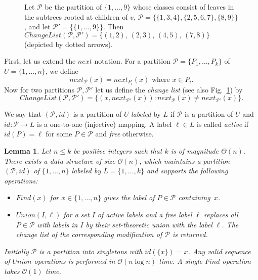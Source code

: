 \documentclass{article}
\theoremstyle{theorem}
\newtheorem{lemma}{Lemma}
\theoremstyle{definition}
\newcommand{\ChangeList}{\mathit{ChangeList}}
\renewcommand{\next}{\mathit{next}}
\newcommand{\Oh}{\mathcal{O}}
\newcommand{\PP}{\mathcal{P}}
\newcommand{\union}{\mathit{Union}}
\newcommand{\find}{\mathit{Find}}
\begin{document}
\begin{figure}[ht]
\clearpage{}
      \caption{
        Let $\PP$ be the partition of $\{1,\ldots,9\}$ whose classes
        consist of leaves in the subtrees rooted at children of $v$,
        $\PP =\{\{1,3,4\},\{2,5,6,7\},\{8,9\}\}$,
        and let $\PP'=\{\{1,\ldots,9\}\}$.
        Then $\ChangeList(\PP,\PP') = \{(1,2),\,(2,3),\,(4,5),\,(7,8)\}$
        (depicted by dotted arrows).
      }\label{fig:ChangeList}
    \end{figure}
  First, let us extend the $\next$ notation.
  For a partition $\PP   = \{P_1,\ldots,P_k\}$ of $U=\{1,\ldots,n\}$, we
  define
  $$\next_{\PP}(x)=\next_{P_i}(x)\text{ where }x\in P_i.$$
  Now for two partitions $\PP  , \PP  '$ let us define the \emph{change list} (see also Fig.~\ref{fig:ChangeList}) by
  $$\ChangeList(\PP  ,\PP  ')= \{(x, \next_{\PP'}(x)): \next_{\PP}(x)\ne \next_{\PP'}(x)\}.$$

 \newcommand{\id}{id}
 We say that $(\PP,\id)$ is a partition of $U$ \emph{labeled} by $L$ if $\PP$ is a partition of $U$ and 
 $\id : \PP \to L$ is a one-to-one (injective) mapping.
 A label $\ell\in L$ is called \emph{active} if $\id(P)=\ell$ for some $P\in
 \PP$ and \emph{free} otherwise.
 \begin{lemma}\label{lem:main_data_structure}
    Let $n\le k$ be positive integers such that $k$ is of magnitude $\Theta(n)$.
    There exists a data structure of size $\Oh(n)$, which maintains a partition $(\PP,\id)$  of $\{1,\ldots,n\}$
    labeled by $L=\{1,\ldots,k\}$ and supports the following operations:
    \begin{itemize}
      \item $\find(x)$ for $x\in\{1,\ldots,n\}$ gives the label of $P\in \PP$ containing~$x$.
      \item $\union(I,\ell)$ for a set $I$ of active labels and a free label
      $\ell$ replaces all $P\in \PP$ with labels in $I$ by their set-theoretic union with the label $\ell$.
      The change list of the corresponding modification of $\PP$ is returned.
    \end{itemize}
    Initially $\PP$ is a partition into singletons with $\id(\{x\})=x$.
    Any valid sequence of $\union$ operations is performed in $\Oh(n\log n)$ time.
    A single $\find$ operation takes $\Oh(1)$ time.
  \end{lemma}
 
\end{document}
